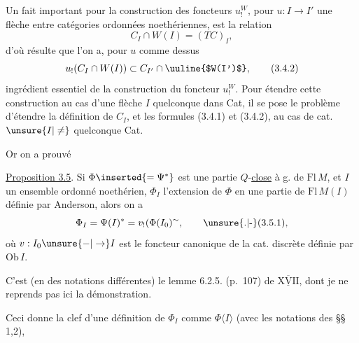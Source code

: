 Un fait important pour la construction des
foncteurs $u^{W}_{!}$, pour  $u:I\longrightarrow I'$ une flèche
entre catégories ordonnées noethériennes, est
la relation
\[
 C_I\cap W(I)=(TC)_I,\tag*{(3.4.1)}
\]
d'où résulte que l'on a, pour $u$ comme dessus
\[
 u_!(C_I\cap W(I))\subset C_{I'}\cap\text{\uuline{$W(I')$}},\tag*{(3.4.2)}
\]
ingrédient essentiel de la construction du
foncteur $u^{W}_{!}$. Pour étendre cette construction
au cas d'une flèche $I$ quelconque dans Cat,
il se pose  le problème d'étendre la
définition de $C_I$, et les formules (3.4.1) et
(3.4.2), au cas de cat. $\unsure{I|\ne}$ quelconque  Cat.

Or on a prouvé

\uline{Proposition 3.5}. Si $\Phi\inserted{=\Psi^*}$ est une partie $Q$-\uline{close} à g.
de $\mathrm{Fl}\,M$,  et $I$ un ensemble ordonné
noethérien, $\Phi_I$ l'extension de $\Phi$ en une partie
de $\mathrm{Fl}\,M(I)$ définie par Anderson, alors on a
\[
 \Phi_I=\Psi(I)^*=v_!(\Phi(I_0)^{\sim},\tag*{\unsure{.|-}(3.5.1),}
\]
où $v:I_0\unsure{-|\to}I$ est le foncteur canonique de
la cat. discrète définie par $\mathrm{Ob}\,I$.

C'est (en des notations différentes) le
lemme 6.2.5. (p.~107) de $\underline{\overline{\mathrm{XVII}}}$, dont je ne
reprends pas ici la démonstration.

Ceci donne la clef d'une définition de $\Phi_I$
comme $\Phi\langle I\rangle$ (avec les notations des \S\S\,1,2),
